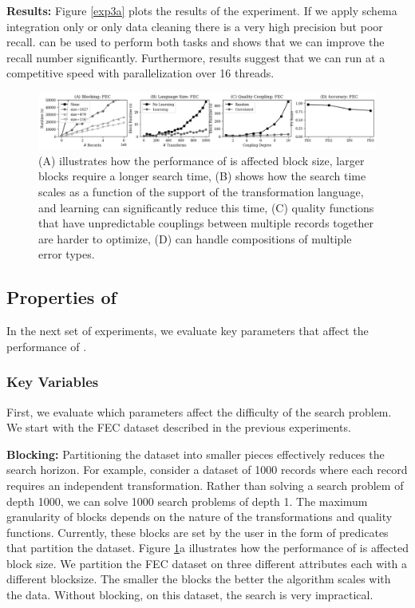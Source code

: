 \vspace{0.5em}\noindent\textbf{Results: } Figure \ref{exp3a} plots the results of the experiment. If we apply schema integration only or only data cleaning there is a very high precision but poor recall. \sys can be used to perform both tasks and shows that we can improve the recall number significantly.
Furthermore, results suggest that we can run \sys at a competitive speed with parallelization over 16 threads.

 \begin{figure}[ht]
\centering
 \includegraphics[width=\textwidth]{exp/exp4.png}
 \caption{(A) illustrates how the performance of \sys is affected block size, larger blocks require a longer search time, (B) shows how the search time scales as a function of the support of the transformation language, and learning can significantly reduce this time, (C) quality functions that have unpredictable couplings between multiple records together are harder to optimize, (D) \sys can handle compositions of multiple error types.
 \label{fig:microbenchmarks}}
\end{figure}

\subsection{Properties of \sys}
In the next set of experiments, we evaluate key parameters that affect the performance of \sys.

\subsubsection{Key Variables}
First, we evaluate which parameters affect the difficulty of the search problem. We start with the FEC dataset described in the previous experiments. 

\vspace{0.5em}\noindent \textbf{Blocking: } Partitioning the dataset into smaller pieces effectively reduces the search horizon. For example, consider a dataset of 1000 records where each record requires an independent transformation. Rather than solving a search problem of depth 1000, we can solve 1000 search problems of depth 1.
The maximum granularity of blocks depends on the nature of the transformations and quality functions.
Currently, these blocks are set by the user in the form of predicates that partition the dataset.
Figure \ref{fig:microbenchmarks}a illustrates how the performance of \sys is affected block size. We partition the FEC dataset on three different attributes each with a different blocksize. The smaller the blocks the better the algorithm scales with the data. Without blocking, on this dataset, the search is very impractical.


